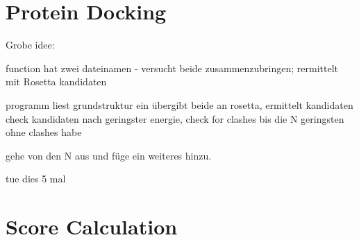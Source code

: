 \documentclass[11pt]{article}
\begin{document}
\date{\today}

\section{Protein Docking}

Grobe idee:

function hat zwei dateinamen
- versucht beide zusammenzubringen; rermittelt mit Rosetta kandidaten

programm liest grundstruktur ein
übergibt beide an rosetta, ermittelt kandidaten
check kandidaten nach geringster energie, check for clashes bis die N geringsten ohne clashes habe

gehe von den N aus und füge ein weiteres hinzu.

tue dies 5 mal


\section{Score Calculation}
\begin{lstlisting}

\end{lstlisting}
\end{document}
